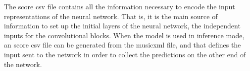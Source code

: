 
The score \gls{csv} file contains all the information
necessary to encode the input representations of the neural
network. That is, it is the main source of information to
set up the initial layers of the neural network, the
independent inputs for the convolutional blocks. When the
model is used in inference mode, an score \gls{csv} file can
be generated from the \gls{musicxml} file, and that defines
the input sent to the network in order to collect the
predictions on the other end of the network.
